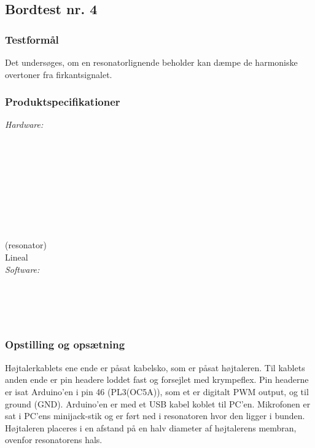 		\subsection{Bordtest nr. 4} %
		\subsubsection{Testformål}
		Det undersøges, om en resonatorlignende beholder kan dæmpe de harmoniske overtoner fra firkantsignalet. 
		
		\subsubsection{Produktspecifikationer}
		
		\textit{Hardware:}\\
		\tores\\
		\hojtalerkabel\\
		\kabelsko\\
		\pins\\
		\krympeflex\\
		\arduino\\
		\mikrofon\\
		\PC\\
		\usbkabel\\
		 (resonator)\\
		Lineal\\
	
		\textit{Software:}\\
		\labview\\
		\visa\\
		\vi\\
		\ardsw\\
		
		
		\subsubsection{Opstilling og opsætning}
		
		Højtalerkablets ene ende er påsat kabelsko, som er påsat højtaleren. Til kablets anden ende er pin headere loddet fast og forsejlet med krympeflex. Pin headerne er isat Arduino'en i pin 46 (PL3(OC5A)), som et er digitalt PWM output, og til ground (GND). 
		Arduino'en er med et USB kabel koblet til PC'en.	
		Mikrofonen er sat i PC'ens minijack-stik og er ført ned i resonatoren hvor den ligger i bunden. Højtaleren placeres i en afstand på en halv diameter af højtalerens membran, ovenfor resonatorens hals. 
		
